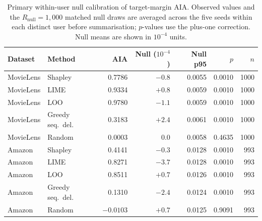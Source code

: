 \begin{table}[!htbp]\centering\scriptsize
\setlength{\tabcolsep}{2.5pt}
\caption{Primary within-user null calibration of target-margin AIA. Observed values and the $R_{\mathrm{null}}=1{,}000$ matched null draws are averaged across the five seeds within each distinct user before summarisation; $p$-values use the plus-one correction. Null means are shown in $10^{-4}$ units.}
\label{tab:aia-null}
\begin{tabular}{@{}llrrrrr@{}}
\toprule
Dataset & Method & AIA & Null ($10^{-4}$) & Null p95 & $p$ & $n$ \\
\midrule
MovieLens & Shapley & 0.7786 & $-0.8$ & 0.0055 & 0.0010 & 1000 \\
MovieLens & LIME & 0.9334 & $+0.8$ & 0.0059 & 0.0010 & 1000 \\
MovieLens & LOO & 0.9780 & $-1.1$ & 0.0059 & 0.0010 & 1000 \\
MovieLens & Greedy seq.\ del. & 0.3183 & $+2.4$ & 0.0061 & 0.0010 & 1000 \\
MovieLens & Random & 0.0003 & $0.0$ & 0.0058 & 0.4635 & 1000 \\
\midrule
Amazon & Shapley & 0.4141 & $-0.3$ & 0.0128 & 0.0010 & 993 \\
Amazon & LIME & 0.8271 & $-3.7$ & 0.0128 & 0.0010 & 993 \\
Amazon & LOO & 0.8511 & $+0.7$ & 0.0126 & 0.0010 & 993 \\
Amazon & Greedy seq.\ del. & 0.1310 & $-2.4$ & 0.0124 & 0.0010 & 993 \\
Amazon & Random & $-0.0103$ & $+0.7$ & 0.0125 & 0.9091 & 993 \\
\bottomrule
\end{tabular}
\end{table}
